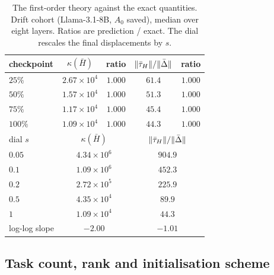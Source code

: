 \begin{table}[t]
\centering
\small
\caption{The first-order theory against the exact quantities. Drift cohort
(Llama-3.1-8B, $A_0$ saved), median over eight layers. Ratios are
prediction / exact. The dial rescales the final displacements by $s$.}
\label{tab:drift-theory}
\begin{tabular}{lcccc}
\toprule
checkpoint & $\kappa(\bar H)$ & ratio & $\|\bar{\tau}_H\|/\|\bar\Delta\|$ & ratio \\
\midrule
$25\%$  & $2.67\times10^{4}$ & $1.000$ & $61.4$ & $1.000$ \\
$50\%$  & $1.57\times10^{4}$ & $1.000$ & $51.3$ & $1.000$ \\
$75\%$  & $1.17\times10^{4}$ & $1.000$ & $45.4$ & $1.000$ \\
$100\%$ & $1.09\times10^{4}$ & $1.000$ & $44.3$ & $1.000$ \\
\midrule
dial $s$ & \multicolumn{2}{c}{$\kappa(\bar H)$} & \multicolumn{2}{c}{$\|\bar{\tau}_H\|/\|\bar\Delta\|$} \\
\midrule
$0.05$ & \multicolumn{2}{c}{$4.34\times10^{6}$} & \multicolumn{2}{c}{$904.9$} \\
$0.1$  & \multicolumn{2}{c}{$1.09\times10^{6}$} & \multicolumn{2}{c}{$452.3$} \\
$0.2$  & \multicolumn{2}{c}{$2.72\times10^{5}$} & \multicolumn{2}{c}{$225.9$} \\
$0.5$  & \multicolumn{2}{c}{$4.35\times10^{4}$} & \multicolumn{2}{c}{$89.9$} \\
$1$    & \multicolumn{2}{c}{$1.09\times10^{4}$} & \multicolumn{2}{c}{$44.3$} \\
\midrule
log-log slope & \multicolumn{2}{c}{$-2.00$} & \multicolumn{2}{c}{$-1.01$} \\
\bottomrule
\end{tabular}
\end{table}

\subsection{Task count, rank and initialisation scheme}
\label{subsec:tr-sweep}

